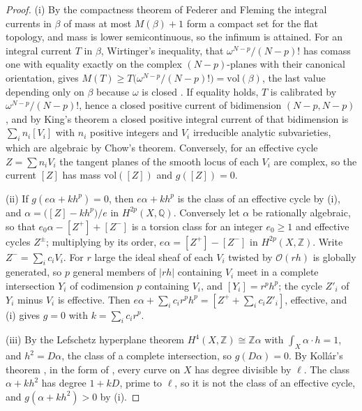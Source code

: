 \documentclass[11pt,reqno]{amsart}
\numberwithin{equation}{section}
\theoremstyle{plain}
\theoremstyle{definition}
\newcommand{\QQ}{\mathbb{Q}}
\newcommand{\ZZ}{\mathbb{Z}}
\begin{document}
\begin{proof}
(i) By the compactness theorem of Federer and Fleming \cite{FF60} the integral currents in $\beta$ of mass at most $M(\beta)+1$ form a compact set for the flat topology, and mass is lower semicontinuous, so the infimum is attained. For an integral current $T$ in $\beta$, Wirtinger's inequality, that $\omega^{N-p}/(N-p)!$ has comass one with equality exactly on the complex $(N-p)$-planes with their canonical orientation, gives $M(T)\ge T\bigl(\omega^{N-p}/(N-p)!\bigr)=\mathrm{vol}(\beta)$, the last value depending only on $\beta$ because $\omega$ is closed \cite{HL82}. If equality holds, $T$ is calibrated by $\omega^{N-p}/(N-p)!$, hence a closed positive current of bidimension $(N-p,N-p)$ \cite{HL82}, and by King's theorem \cite{Kin71} a closed positive integral current of that bidimension is $\sum_{i}n_{i}[V_{i}]$ with $n_{i}$ positive integers and $V_{i}$ irreducible analytic subvarieties, which are algebraic by Chow's theorem. Conversely, for an effective cycle $Z=\sum n_{i}V_{i}$ the tangent planes of the smooth locus of each $V_{i}$ are complex, so the current $[Z]$ has mass $\mathrm{vol}([Z])$ and $g([Z])=0$.

(ii) If $g(e\alpha+kh^{p})=0$, then $e\alpha+kh^{p}$ is the class of an effective cycle by (i), and $\alpha=\bigl([Z]-kh^{p}\bigr)/e$ in $H^{2p}(X,\QQ)$. Conversely let $\alpha$ be rationally algebraic, so that $e_{0}\alpha-[Z^{+}]+[Z^{-}]$ is a torsion class for an integer $e_{0}\ge1$ and effective cycles $Z^{\pm}$; multiplying by its order, $e\alpha=[Z^{+}]-[Z^{-}]$ in $H^{2p}(X,\ZZ)$. Write $Z^{-}=\sum_{i}c_{i}V_{i}$. For $r$ large the ideal sheaf of each $V_{i}$ twisted by $\mathcal{O}(rh)$ is globally generated, so $p$ general members of $|rh|$ containing $V_{i}$ meet in a complete intersection $Y_{i}$ of codimension $p$ containing $V_{i}$, and $[Y_{i}]=r^{p}h^{p}$; the cycle $Z'_{i}$ of $Y_{i}$ minus $V_{i}$ is effective. Then $e\alpha+\sum_{i}c_{i}r^{p}h^{p}=[Z^{+}+\sum_{i}c_{i}Z'_{i}]$, effective, and (i) gives $g=0$ with $k=\sum_{i}c_{i}r^{p}$.

(iii) By the Lefschetz hyperplane theorem $H^{4}(X,\ZZ)\cong\ZZ\alpha$ with $\int_{X}\alpha\cdot h=1$, and $h^{2}=D\alpha$, the class of a complete intersection, so $g(D\alpha)=0$. By Koll\'ar's theorem \cite{Kol92}, in the form of \cite[Thm.~2]{SV05}, every curve on $X$ has degree divisible by $\ell$. The class $\alpha+kh^{2}$ has degree $1+kD$, prime to $\ell$, so it is not the class of an effective cycle, and $g(\alpha+kh^{2})>0$ by (i).
\end{proof}
\end{document}

